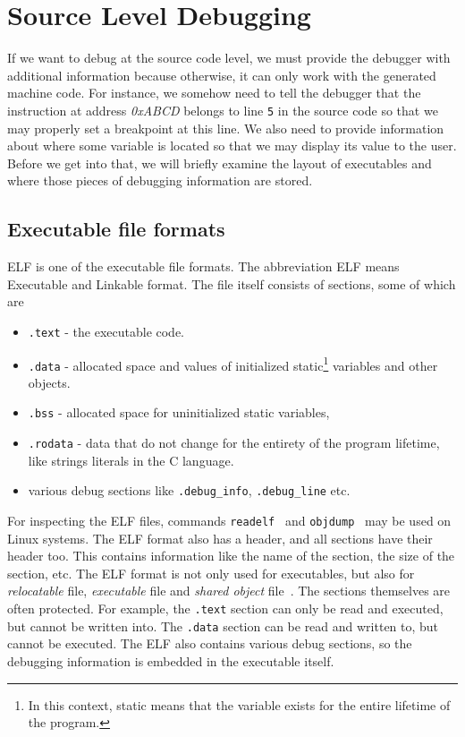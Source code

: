 \section{Source Level Debugging}\label{section:source-level-debugging}
If we want to debug at the source code level, we must provide the debugger with
additional information because otherwise, it can only work with the generated
machine code. For instance, we somehow need to tell the debugger that the
instruction at address \textit{0xABCD} belongs to line \texttt{5} in the source
code so that we may properly set a breakpoint at this line. We also need to
provide information about where some variable is located so that we may display
its value to the user. Before we get into that, we will briefly examine the
layout of executables and where those pieces of debugging information are
stored.

\subsection{Executable file formats}
ELF is one of the executable file formats. The abbreviation ELF means
Executable and Linkable format. The file itself consists of sections, some of
which are
\begin{itemize}
    \item \texttt{.text} - the executable code.
    \item \texttt{.data} - allocated space and values of initialized
        static\footnote{In this context, static means that the variable exists
        for the entire lifetime of the program.} variables and other objects.
    \item \texttt{.bss} - allocated space for uninitialized static variables,
    \item \texttt{.rodata} - data that do not change for the entirety of the
        program lifetime, like strings literals in the C language.
    \item various debug sections like \verb|.debug_info|, \verb|.debug_line|
        etc.
\end{itemize}
For inspecting the ELF files, commands \texttt{readelf}~\cite{readelf} and
\texttt{objdump}~\cite{objdump} may be used on Linux systems. The ELF format
also has a header, and all sections have their header too. This contains
information like the name of the section, the size of the section, etc. The ELF
format is not only used for executables, but also for \textit{relocatable}
file, \textit{executable} file and \textit{shared object} file~\cite{elf}. The
sections themselves are often protected. For example, the \texttt{.text}
section can only be read and executed, but cannot be written into. The
\texttt{.data} section can be read and written to, but cannot be executed. The
ELF also contains various debug sections, so the debugging information is
embedded in the executable itself.

